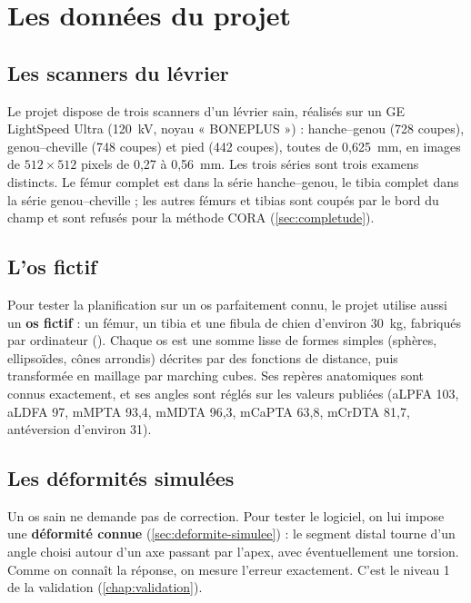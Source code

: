 \section{Les données du projet}
\label{sec:donnees}

\subsection{Les scanners du lévrier}

Le projet dispose de trois scanners d'un lévrier sain, réalisés sur un GE LightSpeed Ultra (120~kV, noyau
« BONEPLUS ») : hanche--genou (728 coupes), genou--cheville (748 coupes) et pied (442 coupes), toutes de 0,625~mm, en
images de $512 \times 512$ pixels de 0,27 à 0,56~mm. Les trois séries sont trois examens distincts. Le fémur complet
est dans la série hanche--genou, le tibia complet dans la série genou--cheville ; les autres fémurs et tibias sont
coupés par le bord du champ et sont refusés pour la méthode CORA (\cref{sec:completude}).

\subsection{L'os fictif}

Pour tester la planification sur un os parfaitement connu, le projet utilise aussi un \textbf{os fictif} : un fémur,
un tibia et une fibula de chien d'environ 30~kg, fabriqués par ordinateur ().
Chaque os est une somme lisse de formes simples (sphères, ellipsoïdes, cônes arrondis) décrites par des fonctions de
distance, puis transformée en maillage par marching cubes. Ses repères anatomiques sont connus exactement, et ses
angles sont réglés sur les valeurs publiées (aLPFA 103\degre, aLDFA 97\degre, mMPTA 93,4\degre, mMDTA 96,3\degre,
mCaPTA 63,8\degre, mCrDTA 81,7\degre, antéversion d'environ 31\degre).

\subsection{Les déformités simulées}

Un os sain ne demande pas de correction. Pour tester le logiciel, on lui impose une \textbf{déformité connue}
(\cref{sec:deformite-simulee}) : le segment distal tourne d'un angle choisi autour d'un axe passant par l'apex, avec
éventuellement une torsion. Comme on connaît la réponse, on mesure l'erreur exactement. C'est le niveau 1 de la
validation (\cref{chap:validation}).

